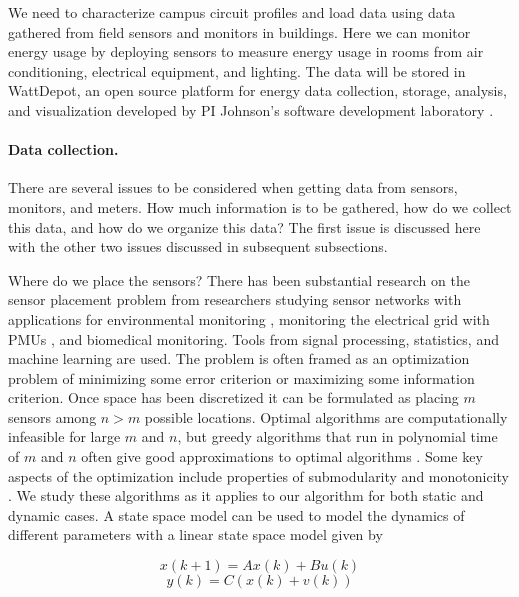 We need to characterize campus circuit profiles and load data using data gathered from field sensors and monitors in buildings. Here we can monitor energy usage by deploying sensors to measure energy usage in rooms from air conditioning, electrical equipment, and lighting.  The data will be stored
in WattDepot, an open source platform for energy data collection, storage,
analysis, and visualization developed by PI Johnson's software development 
laboratory \cite{csdl2-10-05}.
 
\paragraph{Data collection.}

There are several issues to be considered when getting data from sensors,
monitors, and meters.  How much information is to be gathered, how do we
collect this data, and how do we organize this data?  The first issue is
discussed here with the other two issues discussed in subsequent
subsections.

Where do we place the sensors?  There has been substantial research on the
sensor placement problem from researchers studying sensor networks with
applications for environmental monitoring \cite{dhillon2,dhillon3},
monitoring the electrical grid with PMUs \cite{chen-abur,xu-abur}, and
biomedical monitoring.  Tools from signal processing, statistics, and
machine learning are used.  The problem is often framed as an optimization
problem of minimizing some error criterion or maximizing some information
criterion.  Once space has been discretized it can be formulated as placing
$m$ sensors among $n>m$ possible locations.  Optimal algorithms are
computationally infeasible for large $m$ and $n$, but greedy algorithms
that run in polynomial time of $m$ and $n$ often give good approximations
to optimal algorithms \cite{li-negi-ilic,krause-singh-guestrin}.  Some key
aspects of the optimization include properties of submodularity and
monotonicity \cite{nwf}.  We study these algorithms as it applies to our
algorithm for both static and dynamic cases.  A state space model can be
used to model the dynamics of different parameters with a linear state
space model given by

\begin{displaymath}
x(k+1) = A x(k) + B u(k)
\end{displaymath}
\begin{displaymath}
y(k) = C (x(k) + v(k))
\end{displaymath}

